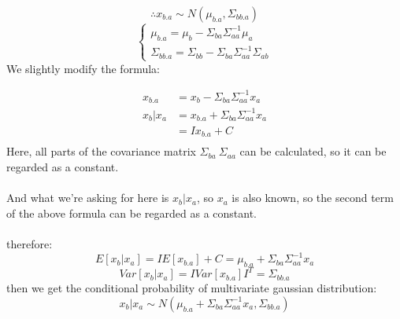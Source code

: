 \documentclass{report}
\begin{document}
$$
\therefore x_{b.a} \sim N(\mu_{b.a}, \Sigma_{bb.a})
$$
$$
\begin{cases}
\mu_{b.a} = \mu_b - \Sigma_{ba} \Sigma_{aa}^{-1} \mu_a \\
\Sigma_{bb.a}=\Sigma_{bb} - \Sigma_{ba} \Sigma_{aa}^{-1} \Sigma_{ab}
\end{cases}
$$
We slightly modify the formula:

$$
\begin{aligned}
x_{b.a}
&=x_b - \Sigma_{ba} \Sigma_{aa}^{-1} x_a\\
x_b | x_a&=x_{b.a} + \Sigma_{ba} \Sigma_{aa}^{-1} x_a\\
&=I x_{b.a} + C\\
\end{aligned}
$$
Here, all parts of the covariance matrix  $\Sigma_{ba} \ \Sigma_{aa}$  can be calculated, so it can be regarded as a constant.\\\\
And what we're asking for here is $x_b | x_a$, so $x_a$ is also known, so the second term of the above formula can be regarded as a constant.\\\\
therefore:
$$
E[x_b|x_a]=I E[x_{b.a}] + C = \mu_{b.a} + \Sigma_{ba} \Sigma_{aa}^{-1} x_a
$$
$$
Var[x_b|x_a]=IVar[x_{b.a}]I^T=\Sigma_{bb.a}
$$
then we get the conditional probability of multivariate gaussian distribution:
$$
x_b|x_a \sim N(\mu_{b.a} + \Sigma_{ba} \Sigma_{aa}^{-1} x_a, \Sigma_{bb.a})
$$
\end{document}
